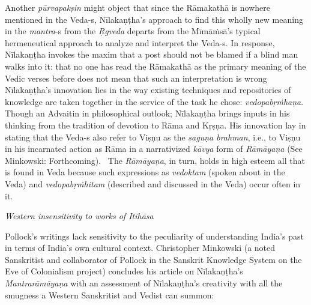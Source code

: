 Another \textit{pūrvapakṣin }might object that since the Rāmakathā is nowhere mentioned in the Veda-s, Nīlakaṇṭha’s approach to find this wholly new meaning in the \textit{mantra}-s from the \textit{Ṛgveda} departs from the Mīmāṁsā’s typical hermeneutical approach to analyze and interpret the Veda-s. In response, Nīlakaṇṭha invokes the maxim that a post should not be blamed if a blind man walks into it: that no one has read the Rāmakathā as the primary meaning of the Vedic verses before does not mean that such an interpretation is wrong Nīlakaṇṭha's innovation lies in the way existing techniques and repositories of knowledge are taken together in the service of the task he chose: \textit{vedopabṛṁhaṇa}. Though an Advaitin in philosophical outlook; Nīlakaṇṭha brings inputs in his thinking from the tradition of devotion to Rāma and Kṛṣṇa. His innovation lay in stating that the Veda-s also refer to Viṣṇu as the \textit{saguṇa brahman}, i.e., to Viṣṇu in his incarnated action as Rāma in a narrativized \textit{kāvya} form of \textit{Rāmāyaṇa} (See Minkowski: Forthcoming).  The \textit{Rāmāyaṇa}, in turn, holds in high esteem all that is found in Veda because such expressions as \textit{vedoktam} (spoken about in the Veda) and \textit{vedopabṛṁhitam} (described and discussed in the Veda) occur often in it.

\textit{Western insensitivity to works of Itihāsa}

Pollock’s writings lack sensitivity to the peculiarity of understanding India’s past in terms of India’s own cultural context. Christopher Minkowski (a noted Sanskritist and collaborator of Pollock in the Sanskrit Knowledge System on the Eve of Colonialism project) concludes his article on Nīlakaṇṭha’s \textit{Mantrarāmāyaṇa} with an assessment of Nīlakaṇṭha’s creativity with all the smugness a Western Sanskritist and Vedist can summon:

